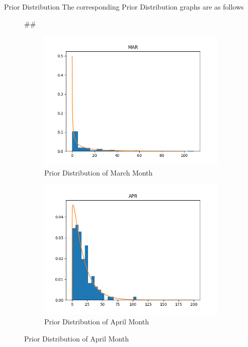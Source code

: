 \documentclass{beamer}
\newenvironment{subcolumns}[1]
 {\valign\bgroup\hsize=#1##\cr}
 {\crcr\egroup}
\newcommand{\nextsubcolumn} {\cr\noalign{\hfill}}
\begin{document}
\begin{frame}{Prior Distribution}
The corresponding Prior Distribution graphs are as follows
\begin{figure}[htp]
\centering
\begin{subcolumns}{0.50\columnwidth}
\begin{subfigure}{0.50\columnwidth}
\centering
\includegraphics[width=\textwidth]{Images/PriorMAR.png}
\caption{Prior Distribution of March Month}
\end{subfigure}
\nextsubcolumn
\begin{subfigure}{0.5\columnwidth}
\centering
\includegraphics[width=\textwidth]{Images/PriorAPR.png}
\caption{Prior Distribution of April Month}
\end{subfigure}
\end{subcolumns}
\end{figure}
\end{frame}
\end{document}
